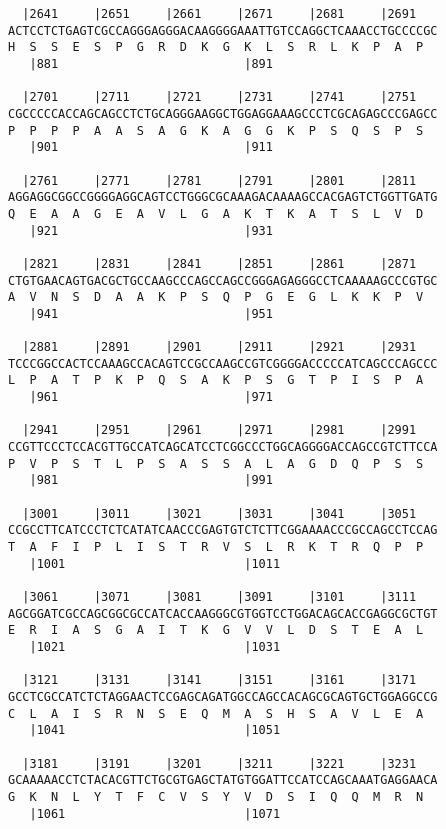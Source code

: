 \documentclass{article}
\begin{document}
\begin{Verbatim}
  |2641     |2651     |2661     |2671     |2681     |2691   
ACTCCTCTGAGTCGCCAGGGAGGGACAAGGGGAAATTGTCCAGGCTCAAACCTGCCCCGC
H  S  S  E  S  P  G  R  D  K  G  K  L  S  R  L  K  P  A  P  
   |881                          |891                       
  
  |2701     |2711     |2721     |2731     |2741     |2751   
CGCCCCCACCAGCAGCCTCTGCAGGGAAGGCTGGAGGAAAGCCCTCGCAGAGCCCGAGCC
P  P  P  P  A  A  S  A  G  K  A  G  G  K  P  S  Q  S  P  S  
   |901                          |911                       
  
  |2761     |2771     |2781     |2791     |2801     |2811   
AGGAGGCGGCCGGGGAGGCAGTCCTGGGCGCAAAGACAAAAGCCACGAGTCTGGTTGATG
Q  E  A  A  G  E  A  V  L  G  A  K  T  K  A  T  S  L  V  D  
   |921                          |931                       
  
  |2821     |2831     |2841     |2851     |2861     |2871   
CTGTGAACAGTGACGCTGCCAAGCCCAGCCAGCCGGGAGAGGGCCTCAAAAAGCCCGTGC
A  V  N  S  D  A  A  K  P  S  Q  P  G  E  G  L  K  K  P  V  
   |941                          |951                       
  
  |2881     |2891     |2901     |2911     |2921     |2931   
TCCCGGCCACTCCAAAGCCACAGTCCGCCAAGCCGTCGGGGACCCCCATCAGCCCAGCCC
L  P  A  T  P  K  P  Q  S  A  K  P  S  G  T  P  I  S  P  A  
   |961                          |971                       
  
  |2941     |2951     |2961     |2971     |2981     |2991   
CCGTTCCCTCCACGTTGCCATCAGCATCCTCGGCCCTGGCAGGGGACCAGCCGTCTTCCA
P  V  P  S  T  L  P  S  A  S  S  A  L  A  G  D  Q  P  S  S  
   |981                          |991                       
  
  |3001     |3011     |3021     |3031     |3041     |3051   
CCGCCTTCATCCCTCTCATATCAACCCGAGTGTCTCTTCGGAAAACCCGCCAGCCTCCAG
T  A  F  I  P  L  I  S  T  R  V  S  L  R  K  T  R  Q  P  P  
   |1001                         |1011                      
  
  |3061     |3071     |3081     |3091     |3101     |3111   
AGCGGATCGCCAGCGGCGCCATCACCAAGGGCGTGGTCCTGGACAGCACCGAGGCGCTGT
E  R  I  A  S  G  A  I  T  K  G  V  V  L  D  S  T  E  A  L  
   |1021                         |1031                      
  
  |3121     |3131     |3141     |3151     |3161     |3171   
GCCTCGCCATCTCTAGGAACTCCGAGCAGATGGCCAGCCACAGCGCAGTGCTGGAGGCCG
C  L  A  I  S  R  N  S  E  Q  M  A  S  H  S  A  V  L  E  A  
   |1041                         |1051                      
  
  |3181     |3191     |3201     |3211     |3221     |3231   
GCAAAAACCTCTACACGTTCTGCGTGAGCTATGTGGATTCCATCCAGCAAATGAGGAACA
G  K  N  L  Y  T  F  C  V  S  Y  V  D  S  I  Q  Q  M  R  N  
   |1061                         |1071                      
  

\end{Verbatim}
\end{document}
